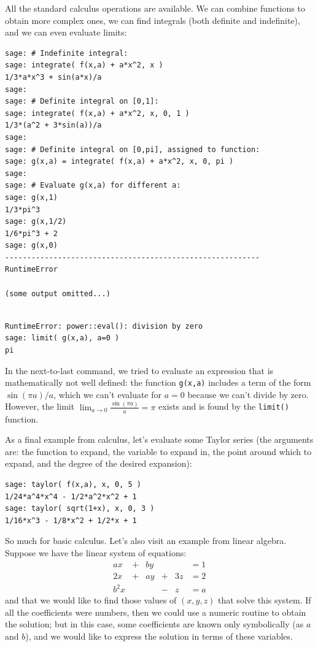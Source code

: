 All the standard calculus operations are available. We can combine
functions to obtain more complex ones, we can find integrals (both
definite and indefinite), and we can even evaluate limits:

\begin{verbatim}
sage: # Indefinite integral:
sage: integrate( f(x,a) + a*x^2, x )
1/3*a*x^3 + sin(a*x)/a
sage: 
sage: # Definite integral on [0,1]:
sage: integrate( f(x,a) + a*x^2, x, 0, 1 )
1/3*(a^2 + 3*sin(a))/a
sage: 
sage: # Definite integral on [0,pi], assigned to function:
sage: g(x,a) = integrate( f(x,a) + a*x^2, x, 0, pi )
sage: 
sage: # Evaluate g(x,a) for different a:
sage: g(x,1)
1/3*pi^3
sage: g(x,1/2)
1/6*pi^3 + 2
sage: g(x,0)
----------------------------------------------------------
RuntimeError

(some output omitted...)
\end{verbatim}
\begin{verbatim}

RuntimeError: power::eval(): division by zero
sage: limit( g(x,a), a=0 )
pi
\end{verbatim}

In the next-to-last command, we tried to evaluate an expression that
is mathematically not well defined: the function \texttt{g(x,a)}
includes a term of the form $\sin(\pi a)/a$, which we can't evaluate
for $a=0$ because we can't divide by zero. However, the limit $\lim_{a
  \to 0} \frac{\sin(\pi a)}{a} = \pi$ exists and is found by the
\texttt{limit()} function.

As a final example from calculus, let's evaluate some Taylor series
(the arguments are: the function to expand, the variable to expand in,
the point around which to expand, and the degree of the desired
expansion):

\begin{verbatim}
sage: taylor( f(x,a), x, 0, 5 )
1/24*a^4*x^4 - 1/2*a^2*x^2 + 1
sage: taylor( sqrt(1+x), x, 0, 3 )
1/16*x^3 - 1/8*x^2 + 1/2*x + 1
\end{verbatim}

So much for basic calculus. Let's also visit an example from linear
algebra. Suppose we have the linear system of equations:
%
\[
\begin{matrix}
a x & + & b y &   &     & = 1 \\
2 x & + & a y & + & 3 z & = 2 \\
b^2 x & &     & - &   z & = a 
\end{matrix}
\]
%
and that we would like to find those values of $(x, y, z)$ that solve
this system. If all the coefficients were numbers, then we could use a
numeric routine to obtain the solution; but in this case, some
coefficients are known only symbolically (as $a$ and $b$), and we would
like to express the solution in terms of these variables.

